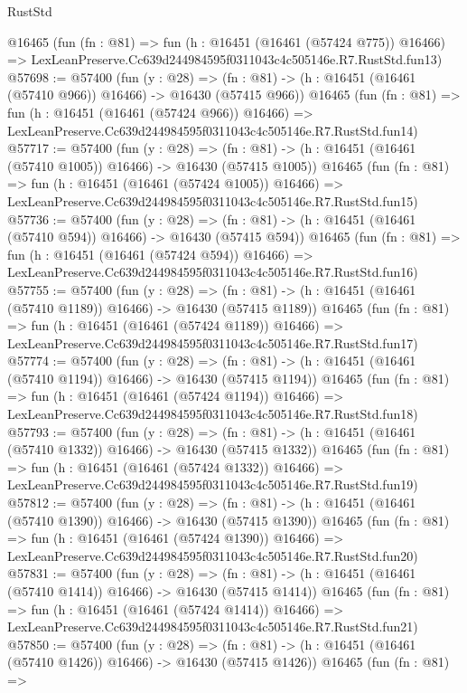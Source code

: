 \begin{lexlean}{RustStd}
\begin{coremodule}
    @16465
    (fun (fn : @81) =>
    fun (h : @16451 (@16461 (@57424 @775)) @16466) =>
    LexLeanPreserve.Cc639d244984595f0311043c4c505146e.R7.RustStd.fun13)
@57698 := @57400
    (fun (y : @28) =>
    (fn : @81) -> (h : @16451 (@16461 (@57410 @966)) @16466) -> @16430 (@57415 @966))
    @16465
    (fun (fn : @81) =>
    fun (h : @16451 (@16461 (@57424 @966)) @16466) =>
    LexLeanPreserve.Cc639d244984595f0311043c4c505146e.R7.RustStd.fun14)
@57717 := @57400
    (fun (y : @28) =>
    (fn : @81) -> (h : @16451 (@16461 (@57410 @1005)) @16466) -> @16430 (@57415 @1005))
    @16465
    (fun (fn : @81) =>
    fun (h : @16451 (@16461 (@57424 @1005)) @16466) =>
    LexLeanPreserve.Cc639d244984595f0311043c4c505146e.R7.RustStd.fun15)
@57736 := @57400
    (fun (y : @28) =>
    (fn : @81) -> (h : @16451 (@16461 (@57410 @594)) @16466) -> @16430 (@57415 @594))
    @16465
    (fun (fn : @81) =>
    fun (h : @16451 (@16461 (@57424 @594)) @16466) =>
    LexLeanPreserve.Cc639d244984595f0311043c4c505146e.R7.RustStd.fun16)
@57755 := @57400
    (fun (y : @28) =>
    (fn : @81) -> (h : @16451 (@16461 (@57410 @1189)) @16466) -> @16430 (@57415 @1189))
    @16465
    (fun (fn : @81) =>
    fun (h : @16451 (@16461 (@57424 @1189)) @16466) =>
    LexLeanPreserve.Cc639d244984595f0311043c4c505146e.R7.RustStd.fun17)
@57774 := @57400
    (fun (y : @28) =>
    (fn : @81) -> (h : @16451 (@16461 (@57410 @1194)) @16466) -> @16430 (@57415 @1194))
    @16465
    (fun (fn : @81) =>
    fun (h : @16451 (@16461 (@57424 @1194)) @16466) =>
    LexLeanPreserve.Cc639d244984595f0311043c4c505146e.R7.RustStd.fun18)
@57793 := @57400
    (fun (y : @28) =>
    (fn : @81) -> (h : @16451 (@16461 (@57410 @1332)) @16466) -> @16430 (@57415 @1332))
    @16465
    (fun (fn : @81) =>
    fun (h : @16451 (@16461 (@57424 @1332)) @16466) =>
    LexLeanPreserve.Cc639d244984595f0311043c4c505146e.R7.RustStd.fun19)
@57812 := @57400
    (fun (y : @28) =>
    (fn : @81) -> (h : @16451 (@16461 (@57410 @1390)) @16466) -> @16430 (@57415 @1390))
    @16465
    (fun (fn : @81) =>
    fun (h : @16451 (@16461 (@57424 @1390)) @16466) =>
    LexLeanPreserve.Cc639d244984595f0311043c4c505146e.R7.RustStd.fun20)
@57831 := @57400
    (fun (y : @28) =>
    (fn : @81) -> (h : @16451 (@16461 (@57410 @1414)) @16466) -> @16430 (@57415 @1414))
    @16465
    (fun (fn : @81) =>
    fun (h : @16451 (@16461 (@57424 @1414)) @16466) =>
    LexLeanPreserve.Cc639d244984595f0311043c4c505146e.R7.RustStd.fun21)
@57850 := @57400
    (fun (y : @28) =>
    (fn : @81) -> (h : @16451 (@16461 (@57410 @1426)) @16466) -> @16430 (@57415 @1426))
    @16465
    (fun (fn : @81) =>

\end{coremodule}
\end{lexlean}
